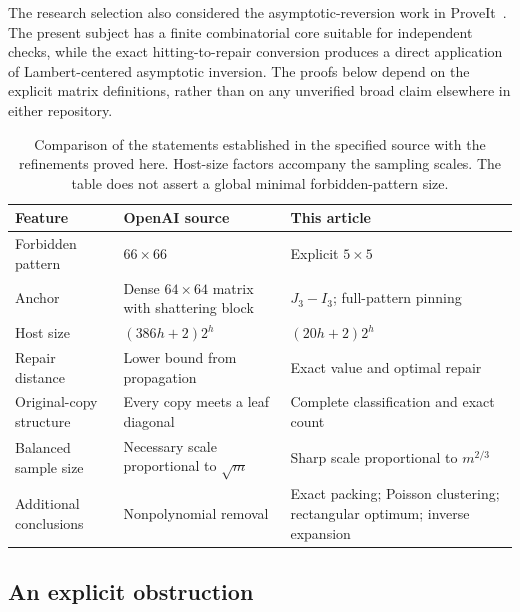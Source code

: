\documentclass[11pt]{article}
\theoremstyle{definition}
\begin{document}
The research selection also considered the asymptotic-reversion
work in ProveIt~\cite{ProveIt}. The present subject
has a finite combinatorial core suitable for independent checks, while
the exact hitting-to-repair conversion produces a direct application of
Lambert-centered asymptotic inversion. The proofs below depend on the
explicit matrix definitions, rather than on any unverified broad claim
elsewhere in either repository.

\begin{table}[ht]
\centering\small
\begin{tabular}{p{}p{}p{}}
\toprule
Feature & OpenAI source~\cite{OAI190} & This article\\
\midrule
Forbidden pattern & \(66\times66\) & Explicit \(5\times5\)\\
Anchor & Dense \(64\times64\) matrix with shattering block & \(J_3-I_3\); full-pattern pinning\\
Host size & \((386h+2)2^h\) & \((20h+2)2^h\)\\
Repair distance & Lower bound from propagation & Exact value and optimal repair\\
Original-copy structure & Every copy meets a leaf diagonal & Complete classification and exact count\\
Balanced sample size & Necessary scale proportional to \(\sqrt m\) & Sharp scale proportional to \(m^{2/3}\)\\
Additional conclusions & Nonpolynomial removal & Exact packing; Poisson clustering; rectangular optimum; inverse expansion\\
\bottomrule
\end{tabular}
\caption{Comparison of the statements established in the specified source
with the refinements proved here. Host-size factors accompany the sampling
scales. The table does not assert a global minimal forbidden-pattern size.}
\label{tab:comparison}
\end{table}

\subsection{An explicit obstruction}
\end{document}
